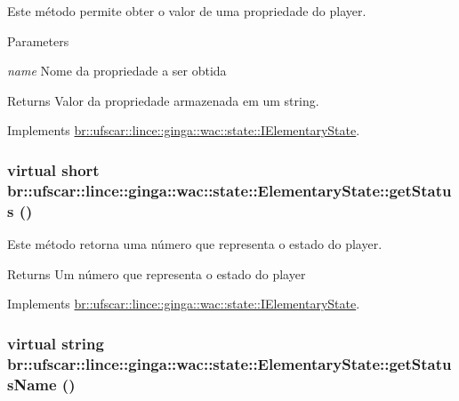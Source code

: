 Este método permite obter o valor de uma propriedade do player. 


\begin{DoxyParams}{Parameters}
\item[{\em name}]Nome da propriedade a ser obtida \end{DoxyParams}
\begin{DoxyReturn}{Returns}
Valor da propriedade armazenada em um string. 
\end{DoxyReturn}


Implements \hyperlink{classbr_1_1ufscar_1_1lince_1_1ginga_1_1wac_1_1state_1_1IElementaryState_a01bae35ea4efe31c179e81db8fb8a126}{br::ufscar::lince::ginga::wac::state::IElementaryState}.

\hypertarget{classbr_1_1ufscar_1_1lince_1_1ginga_1_1wac_1_1state_1_1ElementaryState_a08806ab0fedbb9684ca5a0d1cb42c5ac}{
\subsubsection[{getStatus}]{\setlength{\rightskip}{0pt plus 5cm}virtual short br::ufscar::lince::ginga::wac::state::ElementaryState::getStatus ()}}
\label{classbr_1_1ufscar_1_1lince_1_1ginga_1_1wac_1_1state_1_1ElementaryState_a08806ab0fedbb9684ca5a0d1cb42c5ac}


Este método retorna uma número que representa o estado do player. 

\begin{DoxyReturn}{Returns}
Um número que representa o estado do player 
\end{DoxyReturn}


Implements \hyperlink{classbr_1_1ufscar_1_1lince_1_1ginga_1_1wac_1_1state_1_1IElementaryState_a6df6b08801327e6b2c06c428119caba9}{br::ufscar::lince::ginga::wac::state::IElementaryState}.

\hypertarget{classbr_1_1ufscar_1_1lince_1_1ginga_1_1wac_1_1state_1_1ElementaryState_ae1c2e7da72253acf9b5c19754994047c}{
\subsubsection[{getStatusName}]{\setlength{\rightskip}{0pt plus 5cm}virtual string br::ufscar::lince::ginga::wac::state::ElementaryState::getStatusName ()}}
\label{classbr_1_1ufscar_1_1lince_1_1ginga_1_1wac_1_1state_1_1ElementaryState_ae1c2e7da72253acf9b5c19754994047c}


